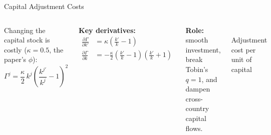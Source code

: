 \documentclass[aspectratio=169,11pt]{beamer}
\newcommand{\emphc}[1]{\textcolor{harvardcrimson}{#1}}
\begin{document}
\begin{frame}{Capital Adjustment Costs}
\begin{columns}[T]
Changing the capital stock is \emphc{costly} ($\kappa = 0.5$, the paper's $\phi$):
\[
\Gamma^j = \frac{\kappa}{2}\, k^j \!\left(\frac{k^{j\prime}}{k^j} - 1\right)^{\!2}
\]

\textbf{Key derivatives:}
\begin{align*}
\frac{\partial \Gamma}{\partial k'} &= \kappa \left(\frac{k'}{k} - 1\right) \\[2pt]
\frac{\partial \Gamma}{\partial k} &= -\frac{\kappa}{2}\left(\frac{k'}{k} - 1\right)\!\left(\frac{k'}{k} + 1\right)
\end{align*}

{\scriptsize\textbf{Role:} smooth investment, break Tobin's $q\!=\!1$, and dampen cross-country \emphc{capital flows}.}

\begin{center}
\\
{\tiny Adjustment cost per unit of capital}
\end{center}
\end{columns}
\end{frame}
\end{document}
